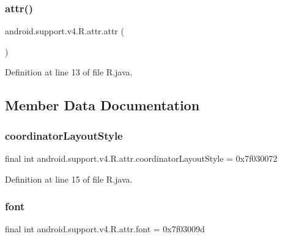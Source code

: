 \subsubsection{\texorpdfstring{attr()}{attr()}}
{\footnotesize\ttfamily android.\+support.\+v4.\+R.\+attr.\+attr (\begin{DoxyParamCaption}{ }\end{DoxyParamCaption})\hspace{0.3cm}{\ttfamily [private]}}



Definition at line 13 of file R.\+java.


\begin{DoxyCode}{0}

\end{DoxyCode}


\subsection{Member Data Documentation}
\mbox{\label{classandroid_1_1support_1_1v4_1_1_r_1_1attr_a5db35f80b8f3fca0907f24dc7765fd3c}} 
\subsubsection{\texorpdfstring{coordinatorLayoutStyle}{coordinatorLayoutStyle}}
{\footnotesize\ttfamily final int android.\+support.\+v4.\+R.\+attr.\+coordinator\+Layout\+Style = 0x7f030072\hspace{0.3cm}{\ttfamily [static]}}



Definition at line 15 of file R.\+java.

\mbox{\label{classandroid_1_1support_1_1v4_1_1_r_1_1attr_a784b971c7ce1ca8f41748ba7abcc48f5}} 
\subsubsection{\texorpdfstring{font}{font}}
{\footnotesize\ttfamily final int android.\+support.\+v4.\+R.\+attr.\+font = 0x7f03009d\hspace{0.3cm}{\ttfamily [static]}}



